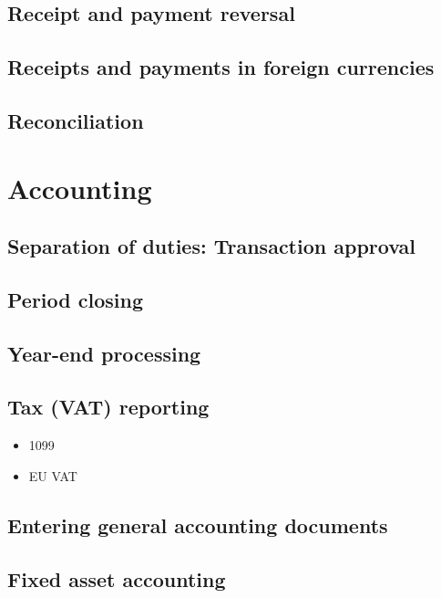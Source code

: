 \documentclass[10pt,A4]{book}
\begin{document}
\section{Receipt and payment reversal}

\section{Receipts and payments in foreign currencies}

\section{Reconciliation}
\label{sec:Reconciliation}

\chapter{Accounting}

\section{Separation of duties: Transaction approval}
\label{sec:SeparationOfDuties}

\section{Period closing}

\section{Year-end processing}

\section{Tax (VAT) reporting}

\begin{itemize}
\item 1099
\item EU VAT
\end{itemize}

\section{Entering general accounting documents}

\section{Fixed asset accounting}
\label{sec:FixedAssetAccounting}
\end{document}
